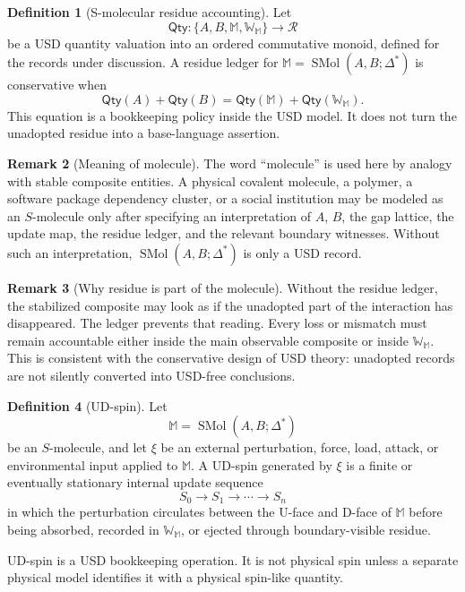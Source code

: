 \documentclass[11pt]{article}
\theoremstyle{definition}
\newtheorem{definition}{Definition}[section]
\newtheorem{remark}[definition]{Remark}
\theoremstyle{plain}
\begin{document}
\begin{definition}[S-molecular residue accounting]
Let
\[
  \mathsf{Qty}:\{A,B,\mathbb M,\mathbb W_{\mathbb M}\}\to\mathcal R
\]
be a USD quantity valuation into an ordered commutative monoid, defined
for the records under discussion.  A residue ledger for
\(\mathbb M=\operatorname{SMol}(A,B;\Delta^*)\) is conservative when
\[
  \mathsf{Qty}(A)+\mathsf{Qty}(B)
  =
  \mathsf{Qty}(\mathbb M)
  +
  \mathsf{Qty}(\mathbb W_{\mathbb M}).
\]
This equation is a bookkeeping policy inside the USD model.  It does not
turn the unadopted residue into a base-language assertion.
\end{definition}

\begin{remark}[Meaning of molecule]
The word ``molecule'' is used here by analogy with stable composite
entities.  A physical covalent molecule, a polymer, a software package
dependency cluster, or a social institution may be modeled as an
\(S\)-molecule only after specifying an interpretation of \(A\), \(B\),
the gap lattice, the update map, the residue ledger, and the relevant
boundary witnesses.  Without such an interpretation,
\(\operatorname{SMol}(A,B;\Delta^*)\) is only a USD record.
\end{remark}

\begin{remark}[Why residue is part of the molecule]
Without the residue ledger, the stabilized composite may look as if the
unadopted part of the interaction has disappeared.  The ledger prevents
that reading.  Every loss or mismatch must remain accountable either
inside the main observable composite or inside
\(\mathbb W_{\mathbb M}\).  This is consistent with the conservative
design of USD theory: unadopted records are not silently converted into
USD-free conclusions.
\end{remark}

\begin{definition}[UD-spin]
Let
\[
  \mathbb M=\operatorname{SMol}(A,B;\Delta^*)
\]
be an \(S\)-molecule, and let \(\xi\) be an external perturbation, force,
load, attack, or environmental input applied to \(\mathbb M\).  A
UD-spin generated by \(\xi\) is a finite or eventually stationary internal
update sequence
\[
  S_0\to S_1\to\cdots\to S_n
\]
in which the perturbation circulates between the U-face and D-face of
\(\mathbb M\) before being absorbed, recorded in
\(\mathbb W_{\mathbb M}\), or ejected through boundary-visible residue.

UD-spin is a USD bookkeeping operation.  It is not physical spin unless a
separate physical model identifies it with a physical spin-like quantity.
\end{definition}
\end{document}
